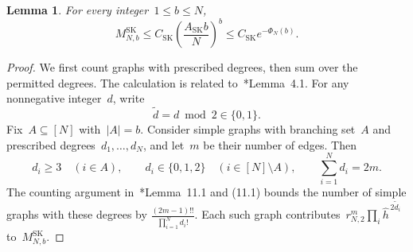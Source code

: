\documentclass[letterpaper,11pt,reqno]{amsart}
\renewcommand{\leq}{\leqslant}
\renewcommand{\geq}{\geqslant}
\newcommand{\hh}{\hat{h}}
\newtheorem{lemma}[theorem]{Lemma}
\begin{document}
\begin{lemma}\label{lem:sk-branching-mass}
For every integer~$1\leq b\leq N$,
\begin{equation}\label{eq:sk-branching-mass}
M^{\mathrm{SK}}_{N,b}\leq C_{\mathrm{SK}}\left(\frac{A_{\mathrm{SK}}b}{N}\right)^b
\leq C_{\mathrm{SK}}e^{-\Phi_N(b)}.
\end{equation}
\end{lemma}
\begin{proof}
We first count graphs with prescribed degrees, then sum over the permitted degrees. The calculation is related to~\cite{DW23}*{Lemma~4.1}. For any nonnegative integer~$d$, write
\begin{equation*}
\widetilde d=d\bmod2\in\{0,1\}.
\end{equation*}
Fix~$A\subseteq[N]$ with~$|A|=b$. Consider simple graphs with branching set~$A$ and prescribed degrees~$d_1,\ldots,d_N$, and let~$m$ be their number of edges. Then
\begin{equation*}
d_i\geq3\quad(i\in A),\qquad
d_i\in\{0,1,2\}\quad(i\in[N]\setminus A),\qquad
\sum_{i=1}^N d_i=2m.
\end{equation*}
The counting argument in~\cite{FK24}*{Lemma~11.1 and (11.1)} bounds the number of simple graphs with these degrees by
\(
\frac{(2m-1)!!}{\prod_{i=1}^N d_i!}.
\)
Each such graph contributes~$r_{N,2}^{m}\prod_i\hh^{\,2\widetilde d_i}$ to~$M^{\mathrm{SK}}_{N,b}$.


\end{proof}
\end{document}
